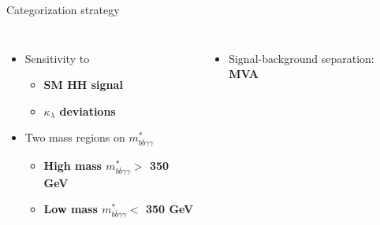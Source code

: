 \begin{frame}{Categorization strategy}

\begin{columns}
\begin{itemize}
    \item Sensitivity to
    \begin{itemize}
        \item \textbf{\textcolor{HHred}{SM HH signal}}
        \item \textbf{\textcolor{HHturquoise_d}{
$\kappa_{\lambda}$ deviations}}
    \end{itemize}
\pause    
    \item Two mass regions on $m_{b \bar{b}\gamma\gamma}^{*}$
    \begin{itemize}
        \item \textbf{\textcolor{HHred}{High mass} $m_{b \bar{b}\gamma\gamma}^{*} >$ 350 GeV}
        \item \textbf{\textcolor{HHturquoise_d}{Low mass} $m_{b \bar{b}\gamma\gamma}^{*} <$ 350 GeV}
    \end{itemize}
\end{itemize}

\begin{itemize}
    \item Signal-background separation: \textbf{MVA}
\end{itemize}



\end{columns}
\end{frame}
